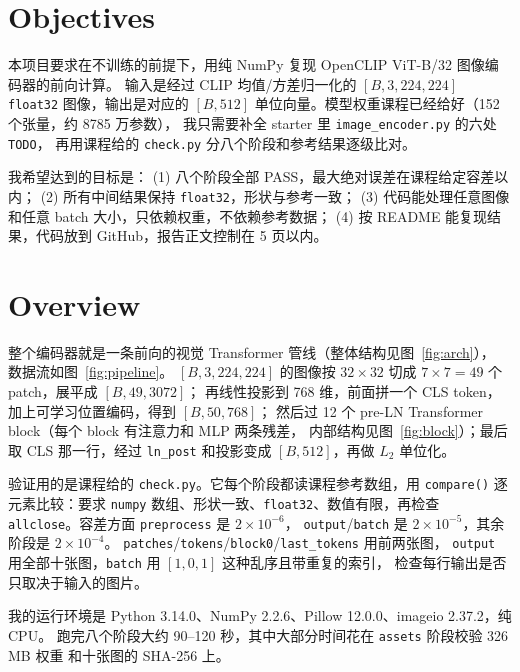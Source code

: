 \documentclass[a4paper,12pt]{article}
\begin{document}

\section{Objectives}

本项目要求在不训练的前提下，用纯 NumPy 复现 OpenCLIP ViT-B/32 图像编码器的前向计算。
输入是经过 CLIP 均值/方差归一化的 $[B,3,224,224]$ \texttt{float32} 图像，输出是对应的
$[B,512]$ 单位向量。模型权重课程已经给好（152 个张量，约 8785 万参数），
我只需要补全 starter 里 \texttt{image\_encoder.py} 的六处 \texttt{TODO}，
再用课程给的 \texttt{check.py} 分八个阶段和参考结果逐级比对。

我希望达到的目标是：
(1) 八个阶段全部 PASS，最大绝对误差在课程给定容差以内；
(2) 所有中间结果保持 \texttt{float32}，形状与参考一致；
(3) 代码能处理任意图像和任意 batch 大小，只依赖权重，不依赖参考数据；
(4) 按 README 能复现结果，代码放到 GitHub，报告正文控制在 5 页以内。

\section{Overview}
整个编码器就是一条前向的视觉 Transformer 管线（整体结构见图~\ref{fig:arch}），
数据流如图~\ref{fig:pipeline}。
$[B,3,224,224]$ 的图像按 $32\times32$ 切成 $7\times7=49$ 个 patch，展平成 $[B,49,3072]$；
再线性投影到 768 维，前面拼一个 CLS token，加上可学习位置编码，得到 $[B,50,768]$；
然后过 12 个 pre-LN Transformer block（每个 block 有注意力和 MLP 两条残差，
内部结构见图~\ref{fig:block}）；最后取 CLS 那一行，经过 \texttt{ln\_post} 和投影变成
$[B,512]$，再做 $L_2$ 单位化。

验证用的是课程给的 \texttt{check.py}。它每个阶段都读课程参考数组，用 \texttt{compare()}
逐元素比较：要求 \texttt{numpy} 数组、形状一致、\texttt{float32}、数值有限，再检查
\texttt{allclose}。容差方面 \texttt{preprocess} 是 $2\times10^{-6}$，
\texttt{output}/\texttt{batch} 是 $2\times10^{-5}$，其余阶段是 $2\times10^{-4}$。
\texttt{patches}/\texttt{tokens}/\texttt{block0}/\texttt{last\_tokens} 用前两张图，
\texttt{output} 用全部十张图，\texttt{batch} 用 $[1,0,1]$ 这种乱序且带重复的索引，
检查每行输出是否只取决于输入的图片。

我的运行环境是 Python 3.14.0、NumPy 2.2.6、Pillow 12.0.0、imageio 2.37.2，纯 CPU。
跑完八个阶段大约 90--120 秒，其中大部分时间花在 \texttt{assets} 阶段校验 326\,MB 权重
和十张图的 SHA-256 上。

\end{document}
